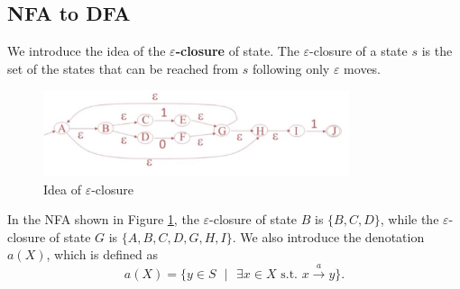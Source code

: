 \subsection{NFA to DFA}
We introduce the idea of the {\bf $\varepsilon$-closure} of state. The $\varepsilon$-closure of a state $s$ is the set of the states that can be reached from $s$ following only $\varepsilon$ moves.
\begin{figure}[ht]
\centering
\includegraphics[width = 0.8\textwidth]{nfaeg.jpg}
\caption{Idea of $\varepsilon$-closure}\label{nfaeg}
\end{figure}
In the NFA shown in Figure \ref{nfaeg}, the $\varepsilon$-closure of state $B$ is $\{B,C,D\}$, while the $\varepsilon$-closure of state $G$ is $\{A,B,C,D,G,H,I\}$. We also introduce the denotation $a(X)$, which is defined as 
\begin{equation*}
a(X) = \{y\in S\text{ }|\text{ }\exists x\in X\text{ s.t. }x\xrightarrow{a}y\}.
\end{equation*}

